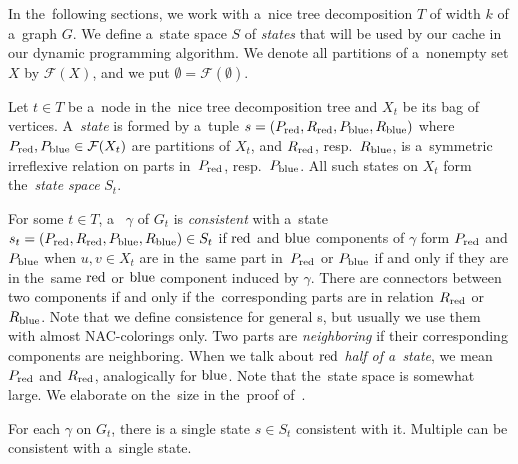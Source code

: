 In the~following sections,
we work with a~nice tree decomposition \( T \) of width \( k \)
of a~graph \( G \).
%
We define a~state space \( S \) of \emph{states}
that will be used by our cache in our dynamic programming algorithm.
We denote all partitions of a~nonempty set \( X \) by \( \mathcal{F}(X) \),
and we put \( \emptyset = \mathcal{F}(\emptyset) \).

%
\begin{definition}
	Let \( t \in T \) be a~node in the~nice tree decomposition tree and
	\( X_t \) be its bag of vertices.
	A~\emph{state} is formed by a~tuple \( s = (P_{\text{red}}, R_{\text{red}}, P_{\text{blue}}, R_{\text{blue}}) \)
	where \( P_{\text{red}}, P_{\text{blue}} \in \mathcal{F}(X_t)\) are partitions of \( X_t \),
	and \( R_{\text{red}}\), resp.\ \(R_{\text{blue}} \), is a~symmetric irreflexive relation
	on parts in~\( P_{\text{red}}\), resp.\ \(P_{\text{blue}} \).
	All such states on \( X_t \) form the~\emph{state space} \( S_t \).
\end{definition}
%
For some \( t \in T \), a~\rbcol{} \( \gamma \) of \( G_t \)
is \emph{consistent} with a~state \( s_t = (P_{\text{red}}, R_{\text{red}}, P_{\text{blue}}, R_{\text{blue}}) \in S_t \)
if \( \text{red} \) and \( \text{blue} \) components of \( \gamma \) form \( P_{\text{red}} \) and \( P_{\text{blue}} \)
when \( u, v \in X_t \) are in the~same part in~\( P_{\text{red}} \) or \( P_{\text{blue}} \)
if and only if they are in the~same \( \text{red} \) or \( \text{blue} \) component induced by \( \gamma \).
There are connectors between two components if and only if
the~corresponding parts are in relation \( R_{\text{red}} \) or \( R_{\text{blue}} \).
%
Note that we define consistence for general \rbcol{}s,
but usually we use them with almost NAC-colorings only.
%
Two parts are \emph{neighboring} if their corresponding components are neighboring.
When we talk about \emph{\( \text{red} \) half of a~state},
we mean \( P_{\text{red}} \) and \( R_{\text{red}} \),
analogically for \( \text{blue} \).
%
Note that the~state space is somewhat large.
We elaborate on the~size in the~proof of~.
%
\begin{observation}
	For each \rbcol{} \( \gamma \) on \( G_t \),
	there is a single state \( s \in S_t \) consistent with it.
	Multiple \rbcol{} can be consistent with a~single state.
\end{observation}
%

